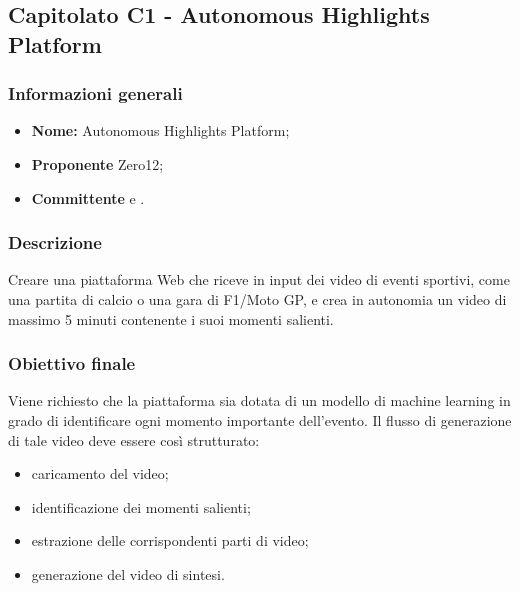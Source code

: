 \subsection{Capitolato C1 - Autonomous Highlights Platform}

\subsubsection{Informazioni generali}
	\begin{itemize}
		\item \textbf{Nome:} Autonomous Highlights Platform; 
		\item \textbf{Proponente} Zero12;
		\item \textbf{Committente} \TV{} e \RC{}. 
	\end{itemize}

\subsubsection{Descrizione}
Creare una piattaforma Web che riceve in input dei video di eventi sportivi, come una partita di calcio o una gara di F1/Moto GP, e crea in autonomia un video di massimo 5 minuti contenente i suoi momenti salienti. 

\subsubsection{Obiettivo finale}
Viene richiesto che la piattaforma sia dotata di un modello di machine learning in grado di identificare ogni momento importante dell’evento.
Il flusso di generazione di tale video deve essere così strutturato:
	\begin{itemize}
		\item caricamento del video;
		\item identificazione dei momenti salienti;
		\item estrazione delle corrispondenti parti di video;
		\item generazione del video di sintesi. 
	\end{itemize}

